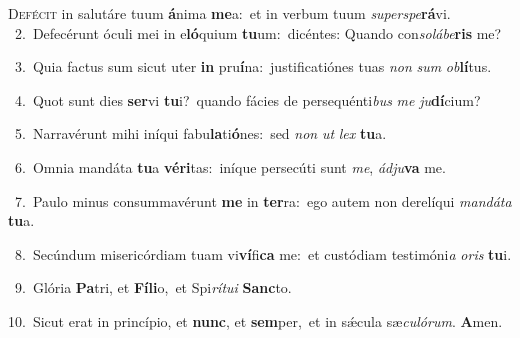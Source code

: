 \lettrine{\initial\textcolor{\initialcolor}{D}}{efécit} in salutáre tuum \textbf{á}\-nima \textbf{me}\-a:~\star et in verbum tuum \textit{su}\-\textit{per}\textit{spe}\textbf{rá}vi.\\
{\numbfont\textcolor{\numbcolor}{~2.}}~Defecérunt óculi mei in e\-\textbf{ló}\-quium \textbf{tu}\-um:~\star dicéntes: Quando con\-\textit{so}\-\textit{lá}\textit{be}\textbf{ris} me?\par
{\numbfont\textcolor{\numbcolor}{~3.}}~Quia factus sum sicut uter \textbf{in} pru\-\textbf{í}\-na:~\star justificatiónes tuas \textit{non} \textit{sum} \textit{ob}\-\textbf{lí}tus.\par
{\numbfont\textcolor{\numbcolor}{~4.}}~Quot sunt dies \textbf{ser}\-vi \textbf{tu}\-i?~\star quando fácies de persequénti\textit{bus} \textit{me} \textit{ju}\-\textbf{dí}cium?\par
{\numbfont\textcolor{\numbcolor}{~5.}}~Narravérunt mihi iníqui fabu\-\textbf{la}\-ti\-\textbf{ó}\-nes:~\star sed \textit{non} \textit{ut} \textit{lex} \textbf{tu}\-a.\par
{\numbfont\textcolor{\numbcolor}{~6.}}~Omnia mandáta \textbf{tu}\-a \textbf{vé}\-\textbf{ri}tas:~\star iníque persecúti sunt \textit{me}\-, \textit{ád}\-\textit{ju}\textbf{va} me.\par
{\numbfont\textcolor{\numbcolor}{~7.}}~Paulo minus consummavérunt \textbf{me} in \textbf{ter}\-ra:~\star ego autem non derelíqui \textit{man}\-\textit{dá}\textit{ta} \textbf{tu}\-a.\par
{\numbfont\textcolor{\numbcolor}{~8.}}~Secúndum misericórdiam tuam vi\-\textbf{ví}\-fi\textbf{ca} me:~\star et custódiam testimóni\textit{a} \textit{o}\-\textit{ris} \textbf{tu}\-i.\par
{\numbfont\textcolor{\numbcolor}{~9.}}~Glória \textbf{Pa}\-tri, et \textbf{Fí}\-\textbf{li}o,~\star et Spi\-\textit{rí}\-\textit{tu}\textit{i} \textbf{Sanc}\-to.\par
{\numbfont\textcolor{\numbcolor}{10.}}~Sicut erat in princípio, et \textbf{nunc}\-, et \textbf{sem}\-per,~\star et in sǽcula sæ\-\textit{cu}\-\textit{ló}\textit{rum}. \textbf{A}\-men.\par
